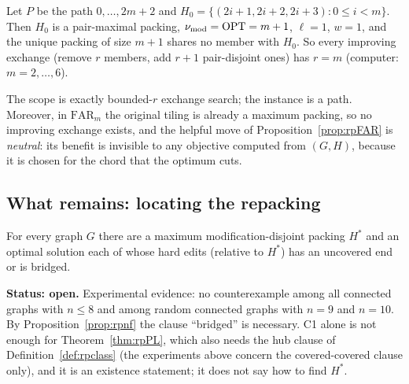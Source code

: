 \begin{proposition}\label{prop:rpaug}
Let $P$ be the path $0,\dots,2m+2$ and $H_0=\{(2i+1,2i+2,2i+3):0\le i<m\}$. Then $H_0$ is a pair-maximal packing, $\nu_{\mathrm{mod}}=\mathrm{OPT}=m+1$, $\ell=1$, $w=1$, and the unique packing of size $m+1$ shares no member with $H_0$. So every improving exchange (remove $r$ members, add $r+1$ pair-disjoint ones) has $r=m$ (computer: $m=2,\dots,6$).
\end{proposition}
The scope is exactly bounded-$r$ exchange search; the instance is a path. Moreover, in $\mathrm{FAR}_m$ the original tiling is already a maximum packing, so no improving exchange exists, and the helpful move of Proposition~\ref{prop:rpFAR} is \emph{neutral}: its benefit is invisible to any objective computed from $(G,H)$, because it is chosen for the chord that the optimum cuts.

\subsection{What remains: locating the repacking}
\begin{conjecture}\label{conj:rpC1}
For every graph $G$ there are a maximum modification-disjoint packing $H^*$ and an optimal solution each of whose hard edits (relative to $H^*$) has an uncovered end or is bridged.
\end{conjecture}
\textbf{Status: open.} Experimental evidence: no counterexample among all connected graphs with $n\le8$ and among random connected graphs with $n=9$ and $n=10$. By Proposition~\ref{prop:rpnf} the clause ``bridged'' is necessary. C1 alone is not enough for Theorem~\ref{thm:rpPL}, which also needs the hub clause of Definition~\ref{def:rpclass} (the experiments above concern the covered-covered clause only), and it is an existence statement; it does not say how to find $H^*$.

